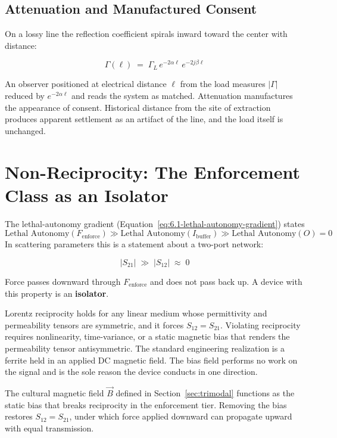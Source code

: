 \subsection{Attenuation and Manufactured Consent}

On a lossy line the reflection coefficient spirals inward toward the center with distance:

\begin{equation}\label{eq:xc.10-lossy-spiral}
\Gamma(\ell) \;=\; \Gamma_L\, e^{-2\alpha \ell}\, e^{-2j\beta \ell}
\end{equation}

An observer positioned at electrical distance $\ell$ from the load measures $|\Gamma|$ reduced by
$e^{-2\alpha\ell}$ and reads the system as matched. Attenuation manufactures the appearance of
consent. Historical distance from the site of extraction produces apparent settlement as an
artifact of the line, and the load itself is unchanged.

\section{Non-Reciprocity: The Enforcement Class as an Isolator}
\label{sec:xc_isolator}

The lethal-autonomy gradient (Equation~\ref{eq:6.1-lethal-autonomy-gradient}) states
\[
\text{Lethal Autonomy}(F_{\text{enforce}}) \gg \text{Lethal Autonomy}(I_{\text{buffer}}) \gg \text{Lethal Autonomy}(O) = 0
\]
In scattering parameters this is a statement about a two-port network:

\begin{equation}\label{eq:xc.11-nonreciprocity}
|S_{21}| \;\gg\; |S_{12}| \;\approx\; 0
\end{equation}

Force passes downward through $F_{\text{enforce}}$ and does not pass back up. A device with this
property is an \textbf{isolator}.

Lorentz reciprocity holds for any linear medium whose permittivity and permeability tensors are
symmetric, and it forces $S_{12} = S_{21}$. Violating reciprocity requires nonlinearity,
time-variance, or a static magnetic bias that renders the permeability tensor antisymmetric. The
standard engineering realization is a ferrite held in an applied DC magnetic field. The bias field
performs no work on the signal and is the sole reason the device conducts in one direction.

\begin{theorem}
\label{thm:cultural-bias}
The cultural magnetic field $\vec{B}$ defined in Section~\ref{sec:trimodal} functions as the static
bias that breaks reciprocity in the enforcement tier. Removing the bias restores $S_{12} = S_{21}$,
under which force applied downward can propagate upward with equal transmission.
\end{theorem}

